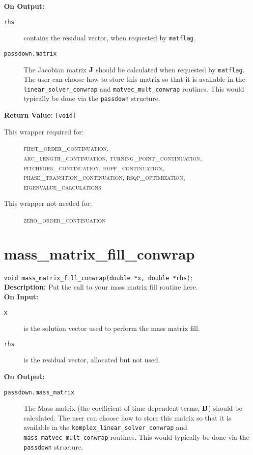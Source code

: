 {\bf On Output:}
\begin{description}
\item[\texttt{rhs}] contains the residual vector, when requested by \texttt{matflag}.
\item[\texttt{passdown.matrix}] The Jacobian matrix ${\bf J}$ should be calculated when requested by \texttt{matflag}. The user can choose how to store this matrix so that it is available in the \texttt{linear\_solver\_conwrap} and \texttt{matvec\_mult\_conwrap} routines. This would typically be done via the \texttt{passdown} structure.
\end{description}

{\bf Return Value:} \texttt{[void]}

\begin{description}
\item[This wrapper required for:]
\textsc{ first\_order\_continuation, \\ arc\_length\_continuation,
turning\_point\_continuation, \\ pitchfork\_continuation, 
hopf\_continuation, \\ phase\_transition\_continuation,
rsqp\_optimization, \\ eigenvalue\_calculations}
\item[This wrapper not needed for:]
\textsc{zero\_order\_continuation}
\end{description}

\section{mass\_matrix\_fill\_conwrap}
\texttt{void mass\_matrix\_fill\_conwrap(double *x, double *rhs)}; \\

{\bf Description:}  Put the call to your mass matrix fill routine here.\\

{\bf On Input:}
\begin{description}
\item[\texttt{x}] is the solution vector used to perform the mass matrix fill.
\item[\texttt{rhs}] is the residual vector, allocated but not used.
\end{description}

{\bf On Output:}
\begin{description}
\item[\texttt{passdown.mass\_matrix}] The Mass matrix (the coefficient of time dependent terms, ${\bf B}$) should be calculated. The user can choose how to store this matrix so that it is available in the \texttt{komplex\_linear\_solver\_conwrap} and \texttt{mass\_matvec\_mult\_conwrap} routines. This would typically be done via the \texttt{passdown} structure.
\end{description}

